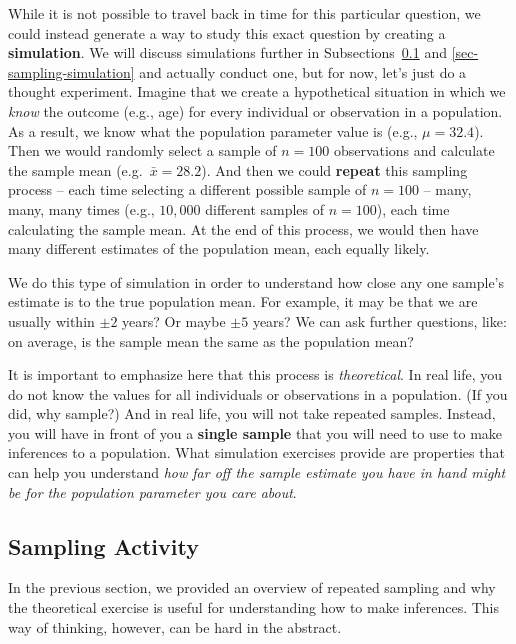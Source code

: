 \documentclass[
  letterpaper,
  DIV=11,
  numbers=noendperiod]{scrreprt}
\theoremstyle{definition}
\theoremstyle{remark}
\begin{document}
While it is not possible to travel back in time for this particular
question, we could instead generate a way to study this exact question
by creating a \textbf{simulation}. We will discuss simulations further
in Subsections~\ref{sec-sampling-activity} and
\ref{sec-sampling-simulation} and actually conduct one, but for now,
let's just do a thought experiment. Imagine that we create a
hypothetical situation in which we \emph{know} the outcome (e.g., age)
for every individual or observation in a population. As a result, we
know what the population parameter value is (e.g., \(\mu = 32.4\)). Then
we would randomly select a sample of \(n = 100\) observations and
calculate the sample mean (e.g.~\(\bar{x} = 28.2\)). And then we could
\textbf{repeat} this sampling process -- each time selecting a different
possible sample of \(n = 100\) -- many, many, many times (e.g.,
\(10,000\) different samples of \(n = 100\)), each time calculating the
sample mean. At the end of this process, we would then have many
different estimates of the population mean, each equally likely.

We do this type of simulation in order to understand how close any one
sample's estimate is to the true population mean. For example, it may be
that we are usually within \(\pm 2\) years? Or maybe \(\pm 5\) years? We
can ask further questions, like: on average, is the sample mean the same
as the population mean?

It is important to emphasize here that this process is
\emph{theoretical}. In real life, you do not know the values for all
individuals or observations in a population. (If you did, why sample?)
And in real life, you will not take repeated samples. Instead, you will
have in front of you a \textbf{single sample} that you will need to use
to make inferences to a population. What simulation exercises provide
are properties that can help you understand \emph{how far off the sample
estimate you have in hand might be for the population parameter you care
about}.

\hypertarget{sec-sampling-activity}{%
\subsection{Sampling Activity}\label{sec-sampling-activity}}

In the previous section, we provided an overview of repeated sampling
and why the theoretical exercise is useful for understanding how to make
inferences. This way of thinking, however, can be hard in the abstract.
\end{document}
